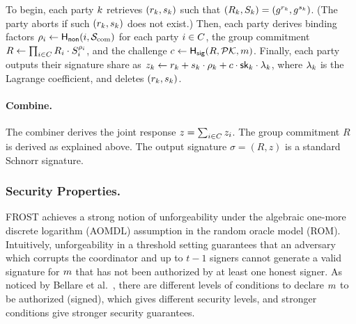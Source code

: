 To begin,
each party $k$ retrieves $(r_{k}, s_{k})$  such that $(R_k, S_k) = (g^{r_{k}}, g^{s_{k}})$. (The party aborts if such $(r_{k}, s_{k})$ does not exist.)
Then, each party derives binding factors $\rho_i \gets \mathsf{H_{non}}(i, \mathcal{S}_{\rm com})$ for each party $i \in C$, the group commitment $R \gets \prod_{i \in C} R_{i} \cdot  S_{i}^{\rho_i}$, and the challenge  $c \gets \mathsf{H_{sig}}(R, \mathcal{PK}, m)$.
Finally, each party outputs their signature share as
$z_k \gets r_{k} + s_{k} \cdot \rho_k + c \cdot \mathsf{sk}_k \cdot \lambda_k$,
where $\lambda_k$ is the Lagrange coefficient, 
and deletes $(r_{k}, s_{k})$.


\paragraph{Combine.}
The combiner  derives the joint response  $z = \sum_{i \in C} z_i$.
The group commitment $R$ is derived as explained above.
The output signature $\sigma = (R,z)$ is a standard Schnorr signature.

\subsubsection{Security Properties.}
FROST achieves a strong notion of unforgeability under the algebraic one-more discrete logarithm (AOMDL) assumption in the random oracle model (ROM).
Intuitively, unforgeability in a threshold setting  guarantees that an adversary which corrupts the coordinator and up to $t-1$ signers  cannot generate a valid signature  for $m$  that has not been authorized by at least one honest signer. 
As noticed  by Bellare et al.~\cite{BellareCKMTZ22}, there are different levels of conditions to declare $m$ to be authorized (signed), which gives different security levels, and stronger conditions give stronger security guarantees.

